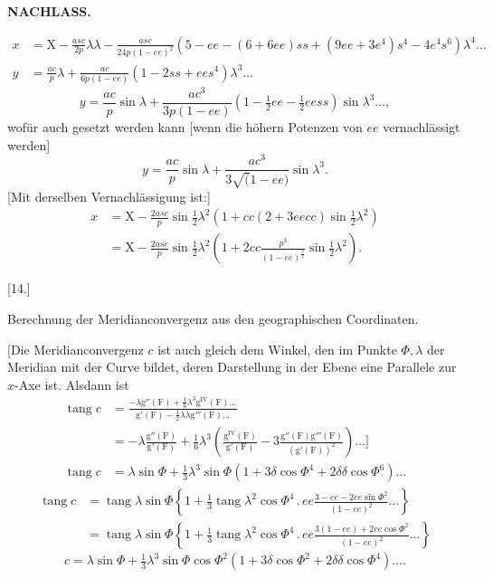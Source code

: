 \par\clearpage
\noindent{}\hfill{\small\textbf{NACHLASS.}}\hfill\null\par\medskip

\[
\begin{aligned}
x&=\mathrm X-\frac{asc}{2p}\lambda\lambda-\frac{asc}{24p(1-ee)^2}
 (5-ee-(6+6ee)ss+(9ee+3e^4)s^4-4e^4s^6)\lambda^4\ldots\\
y&=\frac{ac}{p}\lambda+\frac{ac}{6p(1-ee)}(1-2ss+ees^4)\lambda^3\ldots
\end{aligned}
\]
\noindent [oder]
\[
y=\frac{ac}{p}\sin\lambda+\frac{ac^3}{3p(1-ee)}
 (1-\tfrac12ee-\tfrac12eess)\sin\lambda^3\ldots,
\]
\noindent wofür auch gesetzt werden kann [wenn die höhern Potenzen von \(ee\) vernachlässigt werden]
\[
y=\frac{ac}{p}\sin\lambda+\frac{ac^3}{3\surd(1-ee)}\sin\lambda^3.
\]
[Mit derselben Vernachlässigung ist:]
\[
\begin{aligned}
x&=\mathrm X-\frac{2asc}{p}\sin\tfrac12\lambda^2
 \left(1+cc(2+3eecc)\sin\tfrac12\lambda^2\right)\\
 &=\mathrm X-\frac{2asc}{p}\sin\tfrac12\lambda^2
 \left(1+2cc\frac{p^3}{(1-ee)^{\frac32}}\sin\tfrac12\lambda^2\right).
\end{aligned}
\]

\begin{center}
[14.]\par\medskip
Berechnung der Meridianconvergenz aus den geographischen Coordinaten.
\end{center}
[Die Meridianconvergenz \(c\) ist auch gleich dem Winkel, den im Punkte \(\Phi,\lambda\)
der Meridian mit der Curve bildet, deren Darstellung in der Ebene eine Parallele
zur \(x\)-Axe ist. Alsdann ist
\[
\begin{aligned}
\operatorname{tang}c&=\frac{-\lambda\mathrm g''(\mathrm F)+\tfrac16\lambda^3\mathrm g^{\mathrm{IV}}(\mathrm F)\ldots}
 {\mathrm g'(\mathrm F)-\tfrac12\lambda\lambda\mathrm g'''(\mathrm F)\ldots}\\
 &=-\lambda\frac{\mathrm g''(\mathrm F)}{\mathrm g'(\mathrm F)}
 +\tfrac16\lambda^3\left(\frac{\mathrm g^{\mathrm{IV}}(\mathrm F)}{\mathrm g'(\mathrm F)}
 -3\frac{\mathrm g''(\mathrm F)\mathrm g'''(\mathrm F)}{(\mathrm g'(\mathrm F))^2}\right)\ldots\mathclose{]}\\
\operatorname{tang}c&=\lambda\sin\Phi+\tfrac13\lambda^3\sin\Phi
 (1+3\delta\cos\Phi^4+2\delta\delta\cos\Phi^6)\ldots
\end{aligned}
\]
\noindent [oder]
\[
\begin{aligned}
\operatorname{tang}c&=\operatorname{tang}\lambda\sin\Phi
 \left\{1+\tfrac13\operatorname{tang}\lambda^2\cos\Phi^4\,.\,ee
 \frac{3-ee-2ee\sin\Phi^2}{(1-ee)^2}\ldots\right\}\\
 &=\operatorname{tang}\lambda\sin\Phi
 \left\{1+\tfrac13\operatorname{tang}\lambda^2\cos\Phi^4\,.\,ee
 \frac{3(1-ee)+2ee\cos\Phi^2}{(1-ee)^2}\ldots\right\}
\end{aligned}
\]
\[
c=\lambda\sin\Phi+\tfrac13\lambda^3\sin\Phi\cos\Phi^2
 (1+3\delta\cos\Phi^2+2\delta\delta\cos\Phi^4)\ldots.
\]

